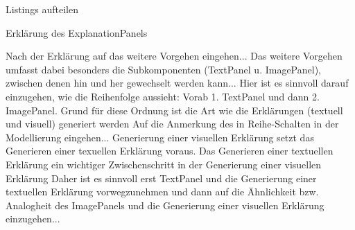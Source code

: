 Listings aufteilen



Erklärung des ExplanationPanels

Nach der Erklärung auf das weitere Vorgehen eingehen...
Das weitere Vorgehen umfasst dabei besonders die Subkomponenten (TextPanel u. ImagePanel), zwischen denen hin und her gewechselt werden kann...
Hier ist es sinnvoll darauf einzugehen, wie die Reihenfolge aussieht: Vorab 1. TextPanel und dann 2. ImagePanel.
Grund für diese Ordnung ist die Art wie die Erklärungen (textuell und visuell) generiert werden
Auf die Anmerkung des in Reihe-Schalten in der Modellierung eingehen...
Generierung einer visuellen Erklärung setzt das Generieren einer texuellen Erklärung voraus.
Das Generieren einer textuellen Erklärung ein wichtiger Zwischenschritt in der Generierung einer visuellen Erklärung
Daher ist es sinnvoll erst TextPanel und die Generierung einer textuellen Erklärung vorwegzunehmen und dann auf die Ähnlichkeit bzw. Analogheit des ImagePanels und die Generierung einer visuellen Erklärung einzugehen...









